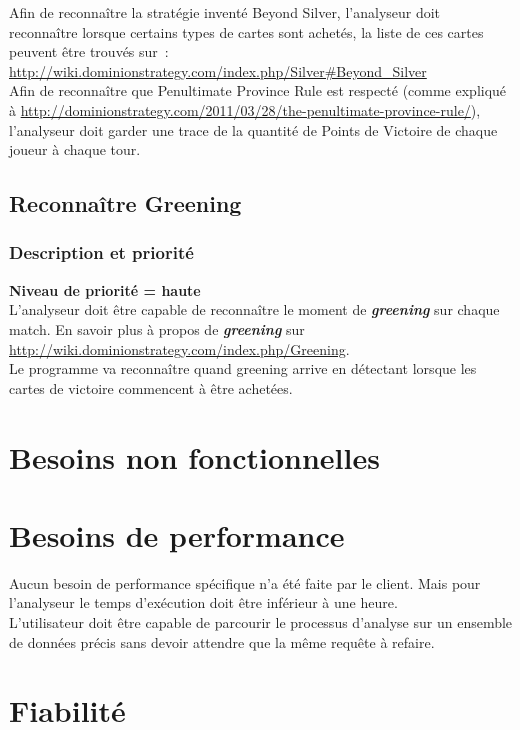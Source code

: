 \documentclass{scrreprt}
\begin{document}
Afin de reconnaître la stratégie inventé Beyond Silver, l'analyseur doit reconnaître lorsque certains types de cartes sont achetés, la liste de ces cartes peuvent être trouvés sur : \url{http://wiki.dominionstrategy.com/index.php/Silver#Beyond_Silver}\\

Afin de reconnaître que Penultimate Province Rule est respecté (comme expliqué à \url{http://dominionstrategy.com/2011/03/28/the-penultimate-province-rule/}), l’analyseur doit garder une trace de la quantité de Points de Victoire de chaque joueur à chaque tour.

\subsection{Reconnaître Greening}
\subsubsection{Description et priorité}
\textbf{Niveau de priorité = haute}\\

L'analyseur doit être capable de reconnaître le moment de \textit{\textbf{greening}} sur chaque match.
En savoir plus à propos de \textit{\textbf{greening}} sur \url{http://wiki.dominionstrategy.com/index.php/Greening}.\\
Le programme va reconnaître quand greening arrive en détectant lorsque les cartes de victoire commencent à être achetées.

\section{Besoins non fonctionnelles }
\section{Besoins de performance}

Aucun besoin de performance spécifique n’a été faite par le client. Mais pour l'analyseur le temps d’exécution  doit être inférieur à une heure.\\
L'utilisateur doit être capable de parcourir le processus d'analyse sur un ensemble de données précis sans devoir attendre que la même requête à refaire.

\section{Fiabilité}
\end{document}

